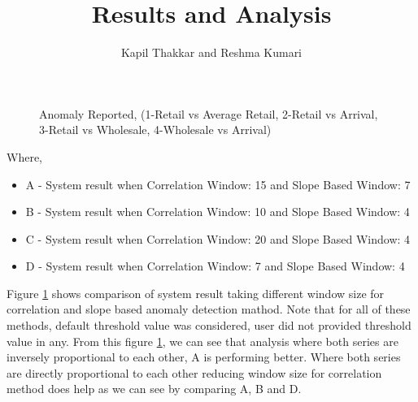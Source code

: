 \documentclass[a4paper,10pt]{report}
\title{Results and Analysis}
\author{Kapil Thakkar and Reshma Kumari}
\begin{document}
\maketitle


\begin{figure}[H]
\centering
{}
\caption{Anomaly Reported, (1-Retail vs Average Retail, 2-Retail vs Arrival, 3-Retail vs Wholesale, 4-Wholesale vs Arrival)}
\label{fig:comparisonMultipleWindows}
\end{figure}

Where,
\begin{itemize}
 \item A - System result when Correlation Window: 15 and Slope Based Window: 7
 \item B - System result when Correlation Window: 10 and Slope Based Window: 4
 \item C - System result when Correlation Window: 20 and Slope Based Window: 4
 \item D - System result when Correlation Window: 7 and Slope Based Window: 4
\end{itemize}


Figure \ref{fig:comparisonMultipleWindows} shows comparison of system result taking different window size for correlation and slope based anomaly detection mathod. Note that for all of these methods, default threshold value was considered, user did not provided threshold value in any. From this figure \ref{fig:comparisonMultipleWindows}, we can see that analysis where both series are inversely proportional to each other, A is performing better. Where both series are directly proportional to each other reducing window size for correlation method does help as we can see by comparing A, B and D.
\end{document}
